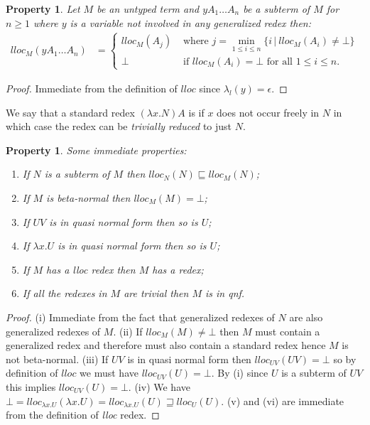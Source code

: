 \documentclass{elsarticle}
\theoremstyle{plain}
\newtheorem{property}[theorem]{Property}
\theoremstyle{definition}
\begin{document}
\begin{property}
\label{prop:qnf_longapply}
    Let $M$ be an untyped term and $y A_1 \ldots A_n$ be a subterm of $M$ for $n\geq1$ where $y$ is a variable not involved in any generalized redex then:
    \begin{align*}
    lloc_M(y A_1 \ldots A_n) &=
        \begin{cases}
         lloc_M (A_j) &\mbox{ where } j = \min_{1\leq i\leq n} \{ i\, | \ lloc_M (A_i) \neq \bot\} \\
         \bot &\mbox{ if } lloc_M(A_i) = \bot \mbox{ for all } 1\leq i\leq n.
        \end{cases}
    \end{align*}
\end{property}
\begin{proof}
    Immediate from the definition of $lloc$ since $\lambda_l(y) = \epsilon$.
\end{proof}

We say that a standard redex $(\lambda x. N) A$ is  if $x$ does not occur freely in $N$ in which case the redex can be \emph{trivially reduced} to just $N$.

\begin{property}
\label{prop:lloc_properties}
Some immediate properties:
\begin{enumerate}[noitemsep,label=(\roman*)]
\item
 If $N$ is a subterm of $M$ then $lloc_N(N) \sqsubseteq lloc_M(N)$;
\item
 If $M$ is beta-normal then $lloc_M(M) = \bot$;
 \item
 If $U V$ is in quasi normal form then so is $U$;
\item
 If $\lambda x . U$ is in quasi normal form then so is $U$;
 \item If $M$ has a \emph{lloc} redex then $M$ has a redex;
 \item If all the redexes in $M$ are trivial then $M$ is in \emph{qnf}.
\end{enumerate}
\end{property}
\begin{proof}
(i) Immediate from the fact that generalized redexes of $N$ are also generalized redexes of $M$. (ii) If $lloc_M(M) \neq \bot$ then $M$ must contain a generalized redex and therefore must also contain a standard redex hence $M$ is not beta-normal.
(iii) If $U V$ is in quasi normal form then $lloc_{UV}(UV) = \bot$ so by definition of $lloc$ we must have $lloc_{UV}(U) = \bot$. By (i) since $U$ is a subterm of $UV$ this implies $lloc_{UV}(U) = \bot$.
(iv) We have $\bot = lloc_{\lambda x . U}(\lambda x . U) = lloc_{\lambda x . U}(U) \sqsupseteq lloc_{U}(U)$.
(v) and (vi) are immediate from the definition of \emph{lloc} redex.
\end{proof}
\end{document}
